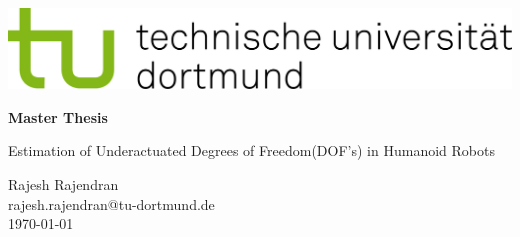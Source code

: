 \documentclass[a4paper,11pt,twoside,DIV10,english,numbers=noendperiod]{scrbook}
\newcommand{\changefont}[3]{
\fontfamily{#1} \fontseries{#2} \fontshape{#3} \selectfont}
\theoremstyle{change}
\theoremstyle{nonumberplain}
\theoremstyle{change}
\theoremstyle{nonumberplain}
\theoremstyle{change}
\theoremstyle{nonumberplain}
\begin{document}

	\setcounter{secnumdepth}{3}
	\setcounter{tocdepth}{3}

	
	\changefont{ptm}{m}{n}
	
	
\begin{titlepage}

 \sffamily

 \vspace*{-2cm}

 \begin{minipage}{0.48\linewidth}
  \includegraphics[width=1.0\textwidth]{Bilder/tud_logo_rgb}
 \end{minipage}
 
 \vspace*{1.7cm}
 \begin{center}
 \hfil
 \begin{minipage}{0.4\linewidth}
 \end{minipage}
 \begin{minipage}{0.15\linewidth}
 \end{minipage}
 \hfil
 \begin{minipage}{0.55\linewidth}
  \begin{center}
    \Large\textbf{Master Thesis}
  \end{center}
  \begin{center}
    \large{Estimation of Underactuated Degrees of Freedom(DOF's) in Humanoid Robots}\\[3ex]
  \end{center}
  \vspace{0.75cm}
  \begin{center}
    \normalsize{Rajesh Rajendran}\\
 
 \small{rajesh.rajendran@tu-dortmund.de}\\[2ex]
    \large{\today}
  \end{center}
 \end{minipage}
 \hfil
 \begin{minipage}{0.05\linewidth}
 \end{minipage}
 \begin{minipage}{0.55\linewidth}
 \vspace{2.0cm}
  \hrulefill
 \end{minipage}
 \end{center}
 \vspace*{2cm}


\end{titlepage}
\end{document}

